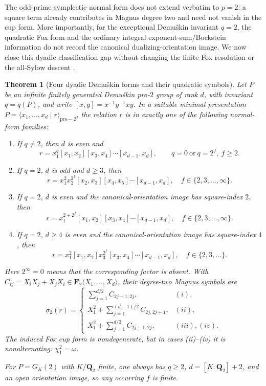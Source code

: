 \documentclass[11pt]{article}
\newtheorem{theorem}{Theorem}[section]
\theoremstyle{definition}
\begin{document}
The odd-prime symplectic normal form does not extend verbatim to
$p=2$: a square term already contributes in Magnus degree two and
need not vanish in the cup form.  More importantly, for the
exceptional Demu\v{s}kin invariant $q=2$, the quadratic Fox form and
the ordinary integral exponent-sum/Bockstein information do not
record the canonical dualizing-orientation image.  We now close this
dyadic classification gap without changing the finite Fox
resolution or the all-Sylow descent \cite{LabuteClassification,NSW}.

\begin{theorem}[Four dyadic Demu\v{s}kin forms and their quadratic symbols]
\label{thm:dyadic-relator-cases}
Let $P$ be an infinite finitely generated Demu\v{s}kin pro-$2$
group of rank $d$, with invariant $q=q(P)$, and write
$[x,y]=x^{-1}y^{-1}xy$.  In a suitable minimal presentation
$P=\langle x_1,\ldots,x_d\mid r\rangle_{\mathrm{pro}-2}$,
the relation $r$ is in exactly one of the following normal-form
families:
\begin{enumerate}[label=\textnormal{(\roman*)}]
\item If $q\ne2$, then $d$ is even and
\[
r=x_1^q[x_1,x_2][x_3,x_4]\cdots[x_{d-1},x_d],
\qquad q=0\ \text{or}\ q=2^f,\ f\ge2.
\]
\item If $q=2$, $d$ is odd and $d\ge3$, then
\[
r=x_1^2x_2^{2^f}[x_2,x_3][x_4,x_5]\cdots[x_{d-1},x_d],
\quad f\in\{2,3,\ldots,\infty\}.
\]
\item If $q=2$, $d$ is even and the canonical-orientation
image has square-index $2$, then
\[
r=x_1^{2+2^f}[x_1,x_2][x_3,x_4]\cdots[x_{d-1},x_d],
\quad f\in\{2,3,\ldots,\infty\}.
\]
\item If $q=2$, $d\ge4$ is even and the canonical-orientation
image has square-index $4$, then
\[
r=x_1^2[x_1,x_2]x_3^{2^f}[x_3,x_4]\cdots[x_{d-1},x_d],
\quad f\in\{2,3,\ldots\}.
\]
\end{enumerate}
Here $2^\infty=0$ means that the corresponding factor is absent.
With $C_{ij}=X_iX_j+X_jX_i\in\mathbf F_2\langle X_1,\ldots,X_d\rangle$,
their degree-two Magnus symbols are
\begin{equation}\label{eq:dyadic-quadratic-symbols}
\sigma_2(r)=
\begin{cases}
\displaystyle\sum_{j=1}^{d/2}C_{2j-1,2j}, &(i),\\[2pt]
\displaystyle X_1^2+\sum_{j=1}^{(d-1)/2}C_{2j,2j+1},
 &(ii),\\[2pt]
\displaystyle X_1^2+\sum_{j=1}^{d/2}C_{2j-1,2j},
 &(iii),(iv).
\end{cases}
\end{equation}
The induced Fox cup form is nondegenerate, but in cases
(ii)--(iv) it is \emph{nonalternating}: $\chi_1^2=\omega$.

For $P=G_K(2)$ with $K/\mathbf Q_2$ finite,
one always has $q\ge2$, $d=[K:\mathbf Q_2]+2$,
and an open orientation image, so any occurring $f$ is finite.
\end{theorem}
\end{document}
